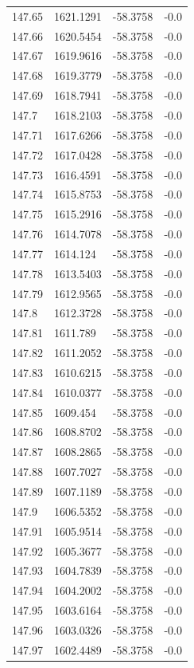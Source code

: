 \begin{table}[H]
\begin{tabular}{llll}
147.65 & 1621.1291 & -58.3758 & -0.0 \\
147.66 & 1620.5454 & -58.3758 & -0.0 \\
147.67 & 1619.9616 & -58.3758 & -0.0 \\
147.68 & 1619.3779 & -58.3758 & -0.0 \\
147.69 & 1618.7941 & -58.3758 & -0.0 \\
147.7 & 1618.2103 & -58.3758 & -0.0 \\
147.71 & 1617.6266 & -58.3758 & -0.0 \\
147.72 & 1617.0428 & -58.3758 & -0.0 \\
147.73 & 1616.4591 & -58.3758 & -0.0 \\
147.74 & 1615.8753 & -58.3758 & -0.0 \\
147.75 & 1615.2916 & -58.3758 & -0.0 \\
147.76 & 1614.7078 & -58.3758 & -0.0 \\
147.77 & 1614.124 & -58.3758 & -0.0 \\
147.78 & 1613.5403 & -58.3758 & -0.0 \\
147.79 & 1612.9565 & -58.3758 & -0.0 \\
147.8 & 1612.3728 & -58.3758 & -0.0 \\
147.81 & 1611.789 & -58.3758 & -0.0 \\
147.82 & 1611.2052 & -58.3758 & -0.0 \\
147.83 & 1610.6215 & -58.3758 & -0.0 \\
147.84 & 1610.0377 & -58.3758 & -0.0 \\
147.85 & 1609.454 & -58.3758 & -0.0 \\
147.86 & 1608.8702 & -58.3758 & -0.0 \\
147.87 & 1608.2865 & -58.3758 & -0.0 \\
147.88 & 1607.7027 & -58.3758 & -0.0 \\
147.89 & 1607.1189 & -58.3758 & -0.0 \\
147.9 & 1606.5352 & -58.3758 & -0.0 \\
147.91 & 1605.9514 & -58.3758 & -0.0 \\
147.92 & 1605.3677 & -58.3758 & -0.0 \\
147.93 & 1604.7839 & -58.3758 & -0.0 \\
147.94 & 1604.2002 & -58.3758 & -0.0 \\
147.95 & 1603.6164 & -58.3758 & -0.0 \\
147.96 & 1603.0326 & -58.3758 & -0.0 \\
147.97 & 1602.4489 & -58.3758 & -0.0 \\

\end{tabular}
\end{table}
